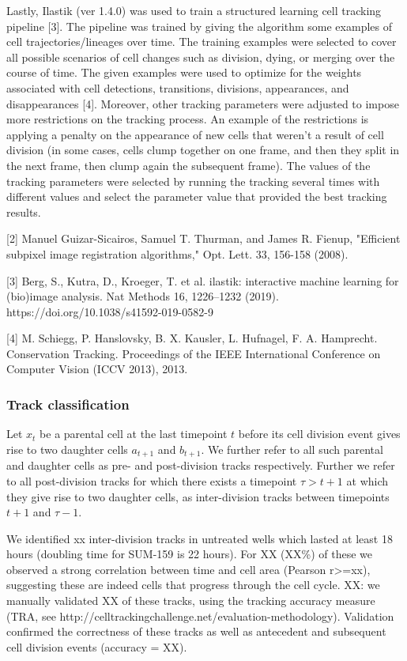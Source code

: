 \documentclass[11pt,notitlepage]{article}
\begin{document}
Lastly, Ilastik (ver 1.4.0) was used to train a structured learning cell tracking pipeline [3]. The pipeline was trained by giving the algorithm some examples of cell trajectories/lineages over time. The training examples were selected to cover all possible scenarios of cell changes such as division, dying, or merging over the course of time. The given examples were used to optimize for the weights associated with cell detections, transitions, divisions, appearances, and disappearances [4].  Moreover, other tracking parameters were adjusted to impose more restrictions on the tracking process. An example of the restrictions is applying a penalty on the appearance of new cells that weren’t a result of cell division (in some cases, cells clump together on one frame, and then they split in the next frame, then clump again the subsequent frame).  The values of the tracking parameters were selected by running the tracking several times with different values and select the parameter value that provided the best tracking results.

[2] Manuel Guizar-Sicairos, Samuel T. Thurman, and James R. Fienup, "Efficient subpixel image registration algorithms," Opt. Lett. 33, 156-158 (2008).

[3] Berg, S., Kutra, D., Kroeger, T. et al. ilastik: interactive machine learning for (bio)image analysis. Nat Methods 16, 1226–1232 (2019). https://doi.org/10.1038/s41592-019-0582-9

[4] M. Schiegg, P. Hanslovsky, B. X. Kausler, L. Hufnagel, F. A. Hamprecht. Conservation Tracking. Proceedings of the IEEE International Conference on Computer Vision (ICCV 2013), 2013.

\subsubsection*{Track classification}

Let $x_t$ be a parental cell at the last timepoint $t$ before its cell division event gives rise to two daughter cells $a_{t+1}$ and $b_{t+1}$. We further refer to all such parental and daughter cells as pre- and post-division tracks respectively. Further we refer to all post-division tracks for which there exists a timepoint $\tau > t+1$ at which they give rise to two daughter cells, as inter-division tracks between timepoints $t+1$ and $\tau - 1$.

We identified xx inter-division tracks in untreated wells which lasted at least 18 hours (doubling time for SUM-159 is 22 hours). For XX (XX\%) of these we observed a strong correlation between time and cell area (Pearson r>=xx), suggesting these are indeed cells that progress through the cell cycle.
XX: we manually validated XX of these tracks, using the tracking accuracy measure (TRA, see http://celltrackingchallenge.net/evaluation-methodology). Validation confirmed the correctness of these tracks as well as antecedent and subsequent cell division events (accuracy = XX).\newline
\end{document}
